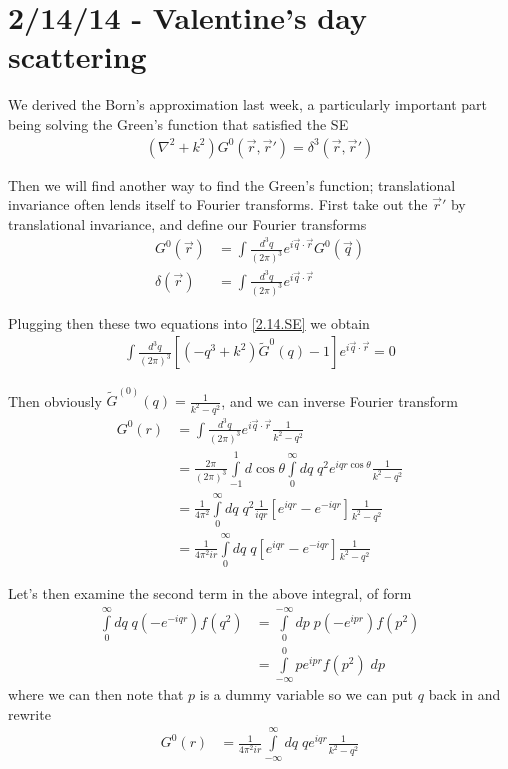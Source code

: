 \documentclass[10pt]{report}
\begin{document}
\chapter{2/14/14 - Valentine's day scattering}

We derived the Born's approximation last week, a particularly important part being solving the Green's function that satisfied the SE
\begin{align}
(\nabla^2 + k^2)G^0(\vec{r}, \vec{r}') = \delta^3(\vec{r}, \vec{r}')
\label{2.14.SE}
\end{align}

Then we will find another way to find the Green's function; translational invariance often lends itself to Fourier transforms. First take out the $\vec{r}'$ by translational invariance, and define our Fourier transforms
\begin{align}
    G^0(\vec{r}) &= \int \frac{d^3q}{(2\pi)^3}e^{i\vec{q}\cdot \vec{r}}G^0(\vec{q})\\
    \delta(\vec{r}) &= \int \frac{d^3q}{(2\pi)^3}e^{i\vec{q}\cdot \vec{r}}
\end{align}

Plugging then these two equations into \ref{2.14.SE} we obtain
\begin{align}
    \int \frac{d^3q}{(2\pi)^3}\left[ (-q^3 + k^2)\tilde{G}^0(q) - 1 \right]e^{i\vec{q}\cdot \vec{r}} = 0
\end{align}

Then obviously $\tilde{G}^(0)(q) = \frac{1}{k^2 - q^2}$, and we can inverse Fourier transform
\begin{align}
    G^0(r) &= \int \frac{d^3q}{(2\pi)^3}e^{i\vec{q}\cdot \vec{r}}\frac{1}{k^2 - q^2}\\
    &= \frac{2\pi}{(2\pi)^3}\displaystyle\int\limits_{-1}^{1}d\cos\theta \displaystyle\int\limits_{0}^{\infty}dq\;q^2e^{iqr\cos\theta}\frac{1}{k^2 - q^2}\\
    &= \frac{1}{4\pi^2}\displaystyle\int\limits_{0}^{\infty}dq\;q^2\frac{1}{iqr}\left[ e^{iqr} - e^{-iqr} \right]\frac{1}{k^2 - q^2}\\
    &= \frac{1}{4\pi^2 ir}\displaystyle\int\limits_{0}^{\infty}dq\;q\left[ e^{iqr}- e^{-iqr} \right]\frac{1}{k^2 - q^2}
\end{align}

Let's then examine the second term in the above integral, of form
\begin{align}
    \displaystyle\int\limits_{0}^{\infty}dq\;q(-e^{-iqr})f(q^2) &= \displaystyle\int\limits_{0}^{-\infty}dp\;p\left( -e^{ipr} \right)f(p^2)\\
    &= \displaystyle\int\limits_{-\infty}^{0}pe^{ipr}f(p^2)\;dp
\end{align}
where we can then note that $p$ is a dummy variable so we can put $q$ back in and rewrite
\begin{align}
    G^0(r) &= \frac{1}{4\pi^2 ir}\displaystyle\int\limits_{-\infty}^{\infty}dq\;qe^{iqr}\frac{1}{k^2 - q^2}
\end{align}
\end{document}
